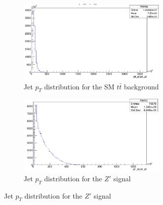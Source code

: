 \begin{figure}[H]
    \centering
    \begin{subfigure}[b]{0.48\textwidth}
        \centering
        \includegraphics[width=0.8\textwidth]{Figure/low_jet_tt.png}
        \caption{Jet \(p_T\) distribution for the SM \(t\bar{t}\) background}
        \label{fig:bplus_mass_1}
    \end{subfigure}
    \hfill
    \begin{subfigure}[b]{0.48\textwidth}
        \centering
        \includegraphics[width=0.8\textwidth]{Figure/low_jet_Z.png}
        \caption{Jet \(p_T\) distribution for the \(Z'\) signal}
        \label{fig:bminus_mass_1}
    \end{subfigure}

    \vspace{0.5cm} %


\end{figure}
